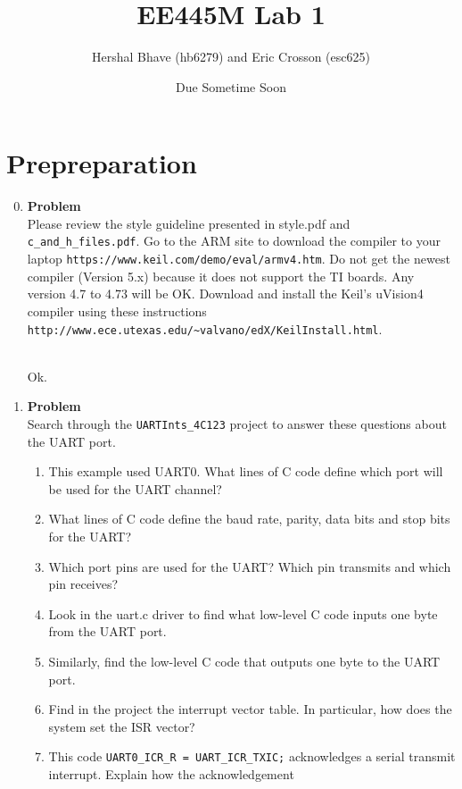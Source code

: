 \documentclass[12pt]{article}
\title{EE445M Lab 1}
\author{Hershal Bhave (hb6279) and Eric Crosson (esc625)}
\date{Due Sometime Soon}
\newenvironment{Ex}{\textbf{Problem}\vspace{.75em}\\}{}
\begin{document}
\maketitle
\section{Prepreparation}
\begin{enumerate}
\setcounter{enumi}{-1}
\item
  \begin{Ex}
    Please review the style guideline presented in style.pdf and
    \verb|c_and_h_files.pdf|. Go to the ARM site to download the
    compiler to your laptop
    \verb|https://www.keil.com/demo/eval/armv4.htm|. Do not get the
    newest compiler (Version 5.x) because it does not support the TI
    boards. Any version 4.7 to 4.73 will be OK. Download and install
    the Keil’s uVision4 compiler using these instructions
    \verb|http://www.ece.utexas.edu/~valvano/edX/KeilInstall.html|.
    \begin{solution} \hfill \vspace{.75em} \\
      Ok.
    \end{solution}
  \end{Ex}
\item
  \begin{Ex}
    Search through the \verb|UARTInts_4C123| project to answer these
    questions about the UART port.
    \begin{enumerate}
    \item This example used UART0. What lines of C code define which
      port will be used for the UART channel?
    \item What lines of C code define the baud rate, parity, data bits
      and stop bits for the UART?
    \item Which port pins are used for the UART? Which pin transmits
      and which pin receives?
    \item Look in the uart.c driver to find what low-level C code
      inputs one byte from the UART port.
    \item Similarly, find the low-level C code that outputs one byte
      to the UART port.
    \item Find in the project the interrupt vector table. In
      particular, how does the system set the ISR vector?
    \item This code \verb|UART0_ICR_R = UART_ICR_TXIC;| acknowledges a
      serial transmit interrupt. Explain how the acknowledgement

\end{enumerate}
\end{Ex}
\end{enumerate}
\end{document}
